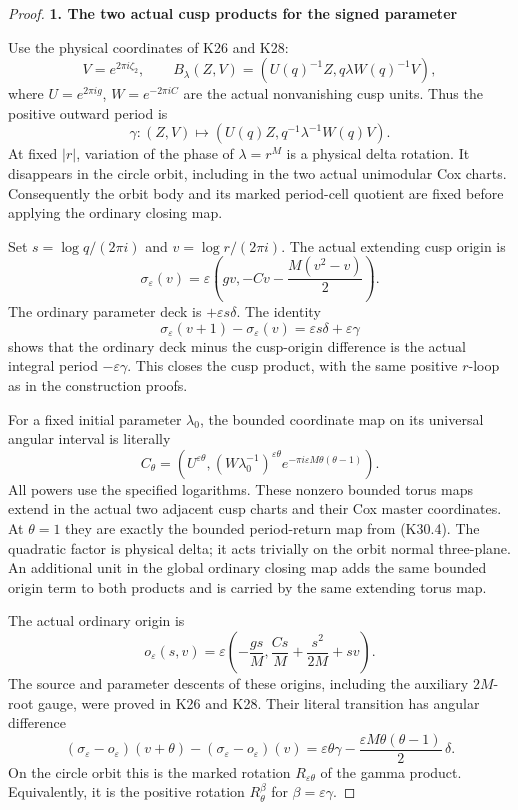\begin{proof}
\par

\medskip\noindent\textbf{1. The two actual cusp products for the signed parameter}

\par\nobreak

Use the physical coordinates of K26 and K28:
\[
 V=e^{2\pi i\zeta_2},\qquad
 B_\lambda(Z,V)=(U(q)^{-1}Z,q\lambda W(q)^{-1}V),
\]
where \(U=e^{2\pi i g}\), \(W=e^{-2\pi i C}\) are the actual
nonvanishing cusp units. Thus the positive outward period is
\[
 \gamma:(Z,V)\longmapsto
      (U(q)Z,q^{-1}\lambda^{-1}W(q)V).
 \tag{K30.2}
\]
At fixed \(|r|\), variation of the phase of \(\lambda=r^M\)
is a physical delta rotation. It disappears in the circle orbit,
including in the two actual unimodular Cox charts. Consequently
the orbit body and its marked period-cell quotient are fixed
before applying the ordinary closing map.

Set \(s=\log q/(2\pi i)\) and \(v=\log r/(2\pi i)\).
The actual extending cusp origin is
\[
 \sigma_\varepsilon(v)
       =\varepsilon\left(gv,-Cv-\frac{M(v^2-v)}2\right).
 \tag{K30.3}
\]
The ordinary parameter deck is \(+\varepsilon s\delta\).
The identity
\[
 \sigma_\varepsilon(v+1)-\sigma_\varepsilon(v)
            =\varepsilon s\delta+\varepsilon\gamma
 \tag{K30.4}
\]
shows that the ordinary deck minus the cusp-origin difference
is the actual integral period \(-\varepsilon\gamma\).
This closes the cusp product, with the same positive \(r\)-loop
as in the construction proofs.

For a fixed initial parameter \(\lambda_0\), the bounded
coordinate map on its universal angular interval is literally
\[
 C_\theta=
 \left(
 U^{\varepsilon\theta},
 (W\lambda_0^{-1})^{\varepsilon\theta}
       e^{-\pi i\varepsilon M\theta(\theta-1)}
 \right).
 \tag{K30.5}
\]
All powers use the specified logarithms. These nonzero bounded
torus maps extend in the actual two adjacent cusp charts and
their Cox master coordinates. At \(\theta=1\) they are exactly
the bounded period-return map from (K30.4). The quadratic
factor is physical delta; it acts trivially on the orbit normal
three-plane. An additional unit in the global ordinary closing
map adds the same bounded origin term to both products and
is carried by the same extending torus map.

The actual ordinary origin is
\[
 o_\varepsilon(s,v)
       =\varepsilon\left(
          -\frac{gs}{M},
          \frac{Cs}{M}+\frac{s^2}{2M}+sv\right).
 \tag{K30.6}
\]
The source and parameter descents of these origins, including
the auxiliary \(2M\)-root gauge, were proved in K26 and K28.
Their literal transition has angular difference
\[
 (\sigma_\varepsilon-o_\varepsilon)(v+\theta)
       -(\sigma_\varepsilon-o_\varepsilon)(v)
   =\varepsilon\theta\gamma
       -\frac{\varepsilon M\theta(\theta-1)}2\,\delta .
 \tag{K30.7}
\]
On the circle orbit this is the marked rotation
\(R_{\varepsilon\theta}\) of the gamma product. Equivalently,
it is the positive rotation \(R^\beta_\theta\) for
\(\beta=\varepsilon\gamma\).


\end{proof}
